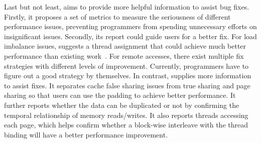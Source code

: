 
Last but not least, \NP{} aims to provide more helpful information to assist bug fixes. 
Firstly, it proposes a set of metrics to measure the seriousness of different performance issues, preventing programmers from spending unnecessary efforts on insignificant issues. Secondly, its report could guide users for a better fix. For load imbalance issues, \NP{} suggests a thread assignment that could achieve much better performance than existing work~\cite{SyncPerf}. For remote accesses, there exist multiple fix strategies with different levels of improvement. Currently, programmers have to figure out a good strategy by themselves. In contrast, \NP{} supplies more information to assist fixes. It separates cache false sharing issues from true sharing and page sharing so that users can use the padding to achieve better performance. It further reports whether the data can be duplicated or not by confirming the temporal relationship of memory reads/writes. It also reports threads accessing each page, which helps confirm whether a block-wise interleave with the thread binding will have a better performance improvement. 




